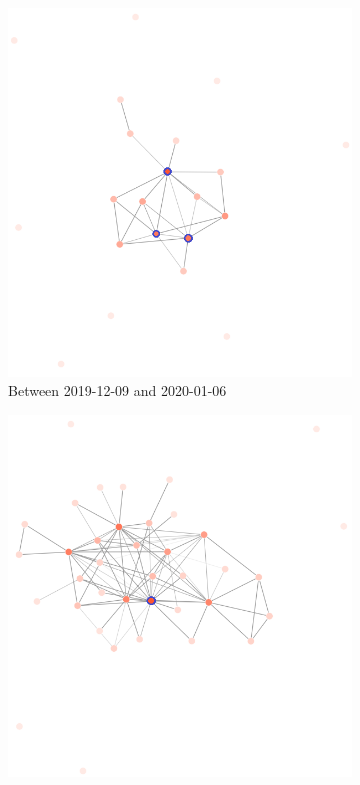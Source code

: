 \begin{figure}[!htbp]
    \centering
    \begin{subfigure}{0.49\textwidth}
        \centering
        \includegraphics[width=\textwidth]{figures/qualitative/core_periphery/numpy_before.png}
        \caption{Between 2019-12-09 and 2020-01-06}
        \label{fig:numpy-before}
    \end{subfigure}
    \hfill
    \begin{subfigure}{0.49\textwidth}
        \centering
        \includegraphics[width=\textwidth]{figures/qualitative/core_periphery/numpy_after.png}

\end{subfigure}
\end{figure}
